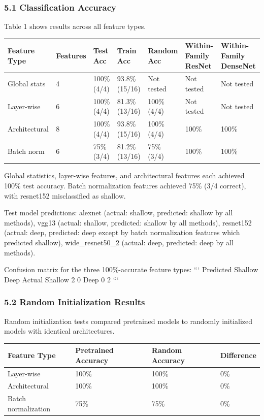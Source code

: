 
\subsubsection{5.1 Classification Accuracy}

Table 1 shows results across all feature types.

\begin{table}[htbp]
\centering
\begin{tabular}{lllllll}
\toprule
Feature Type & Features & Test Acc & Train Acc & Random Acc & Within-Family ResNet & Within-Family DenseNet \\
\midrule
Global stats & 4 & 100\% (4/4) & 93.8\% (15/16) & Not tested & Not tested & Not tested \\
Layer-wise & 6 & 100\% (4/4) & 81.3\% (13/16) & 100\% (4/4) & Not tested & Not tested \\
Architectural & 8 & 100\% (4/4) & 93.8\% (15/16) & 100\% (4/4) & 100\% & 100\% \\
Batch norm & 6 & 75\% (3/4) & 81.2\% (13/16) & 75\% (3/4) & 100\% & 100\% \\
\bottomrule
\end{tabular}
\end{table}

Global statistics, layer-wise features, and architectural features each achieved 100\% test accuracy. Batch normalization features achieved 75\% (3/4 correct), with resnet152 misclassified as shallow.

Test model predictions: alexnet (actual: shallow, predicted: shallow by all methods), vgg13 (actual: shallow, predicted: shallow by all methods), resnet152 (actual: deep, predicted: deep except by batch normalization features which predicted shallow), wide_resnet50_2 (actual: deep, predicted: deep by all methods).

Confusion matrix for the three 100\%-accurate feature types:
```
              Predicted
           Shallow  Deep
Actual  
Shallow      2       0
Deep         0       2
```

\subsubsection{5.2 Random Initialization Results}

Random initialization tests compared pretrained models to randomly initialized models with identical architectures.

\begin{table}[htbp]
\centering
\begin{tabular}{llll}
\toprule
Feature Type & Pretrained Accuracy & Random Accuracy & Difference \\
\midrule
Layer-wise & 100\% & 100\% & 0\% \\
Architectural & 100\% & 100\% & 0\% \\
Batch normalization & 75\% & 75\% & 0\% \\
\bottomrule
\end{tabular}
\end{table}

